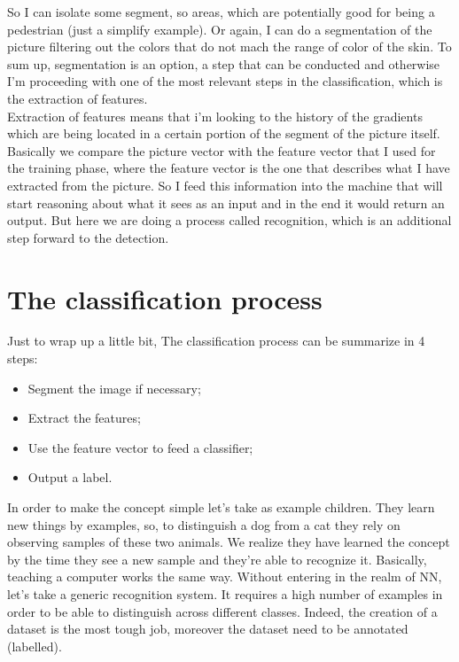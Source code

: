 So I can isolate some segment, so areas, which are potentially good for being a pedestrian (just a simplify example).
Or again, I can do a segmentation of the picture filtering out the colors that do not mach the range of color of the skin.
To sum up, segmentation is an option, a step that can be conducted and otherwise I'm proceeding with one of the most relevant steps in the classification, which is the extraction of features.
\\
Extraction of features means that i'm looking to the history of the gradients which are being located in a certain portion of the segment of the picture itself.
Basically we compare the picture vector with the feature vector that I used for the training phase, where the feature vector is the one that describes what I have extracted from the picture.
So I feed this information into the machine that will start reasoning about what it sees as an input and in the end it would return an output.
But here we are doing a process called recognition, which is an additional step forward to the detection.
\section{The classification process}
Just to wrap up a little bit, The classification process can be summarize in 4 steps:
\begin{itemize}
    \item Segment the image if necessary;
    \item Extract the features;
    \item Use the feature vector to feed a classifier;
    \item Output a label.
\end{itemize}
In order to make the concept simple let's take as example children. They learn new things by examples, so, to distinguish a dog from a cat they rely on observing samples of these two animals. 
We realize they have learned the concept by the time they see a new sample and they’re able to recognize it.
Basically, teaching a computer works the same way.
Without entering in the realm of NN, let's take a generic recognition system. It requires a high number of examples in order to be able to distinguish across different classes.
Indeed, the creation of a dataset is the most tough job, moreover the dataset need to be annotated (labelled).
